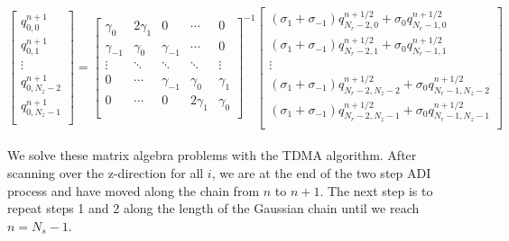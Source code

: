 \documentclass[11pt]{article} %
\begin{document}
\[  \begin{bmatrix}
q_{0,0}^{n+1} \\[0.5em]
q_{0,1}^{n+1} \\[0.5em]
\vdots \\[0.5em]
q_{0,N_z-2}^{n+1} \\[0.5em]
q_{0,N_z-1}^{n+1} \\[0.5em]
\end{bmatrix} = 
%
\begin{bmatrix}
\gamma_0 & 2\gamma_1 & 0 & \cdots & 0 \\[0.5em]
\gamma_{-1} & \gamma_0 & \gamma_{-1} &\cdots &0 \\[0.5em]
\vdots & \ddots & \ddots & \ddots & \vdots \\[0.5em]
0 & \cdots & \gamma_{-1} & \gamma_0 & \gamma_1  \\[0.5em]
0 & \cdots & 0 & 2\gamma_1 & \gamma_0 \\[0.5em]
\end{bmatrix}^{-1} 
%
\begin{bmatrix}
(\sigma_1+\sigma_{-1})q_{N_r-2,0}^{n+1/2}+ \sigma_0q_{N_r-1,0}^{n+1/2} \\[0.5em]
(\sigma_1+\sigma_{-1})q_{N_r-2,1}^{n+1/2}+ \sigma_0q_{N_r-1,1}^{n+1/2} \\[0.5em]
\vdots \\[0.5em]
(\sigma_1+\sigma_{-1})q_{N_r-2,N_z-2}^{n+1/2}+\sigma_0q_{N_r-1,N_z-2}^{n+1/2} \\[0.5em]
(\sigma_1+\sigma_{-1})q_{N_r-2,N_z-1}^{n+1/2}+ \sigma_0q_{N_r-1,N_z-1}^{n+1/2} \\[0.5em]
\end{bmatrix}
\] \\[12pt]

We solve these matrix algebra problems with the TDMA algorithm. After scanning over the z-direction for all $i$, we are  at the end of the two step ADI process and have moved along the chain from $n$ to $n+1$. The next step is to repeat steps 1 and 2 along the length of the Gaussian chain until we reach $n=N_s-1$. 
 
\end{document}
